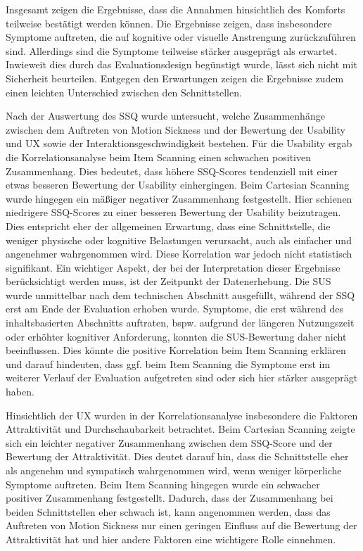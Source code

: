Insgesamt zeigen die Ergebnisse, dass die Annahmen hinsichtlich des Komforts teilweise bestätigt werden können. Die Ergebnisse zeigen, dass insbesondere Symptome auftreten, die auf kognitive oder visuelle Anstrengung zurückzuführen sind. Allerdings sind die Symptome teilweise stärker ausgeprägt als erwartet. Inwieweit dies durch das Evaluationsdesign begünstigt wurde, lässt sich nicht mit Sicherheit beurteilen. Entgegen den Erwartungen zeigen die Ergebnisse zudem einen leichten Unterschied zwischen den Schnittstellen. 

Nach der Auswertung des SSQ wurde untersucht, welche Zusammenhänge zwischen dem Auftreten von Motion Sickness und der Bewertung der Usability und UX sowie der Interaktionsgeschwindigkeit bestehen.
Für die Usability ergab die Korrelationsanalyse beim Item Scanning einen schwachen positiven Zusammenhang. Dies bedeutet, dass höhere SSQ-Scores tendenziell mit einer etwas besseren Bewertung der Usability einhergingen. Beim Cartesian Scanning wurde hingegen ein mäßiger negativer Zusammenhang festgestellt. Hier schienen niedrigere SSQ-Scores zu einer besseren Bewertung der Usability beizutragen. Dies entspricht eher der allgemeinen Erwartung, dass eine Schnittstelle, die weniger physische oder kognitive Belastungen verursacht, auch als einfacher und angenehmer wahrgenommen wird. Diese Korrelation war jedoch nicht statistisch signifikant. Ein wichtiger Aspekt, der bei der Interpretation dieser Ergebnisse berücksichtigt werden muss, ist der Zeitpunkt der Datenerhebung. Die SUS wurde unmittelbar nach dem technischen Abschnitt ausgefüllt, während der SSQ erst am Ende der Evaluation erhoben wurde. Symptome, die erst während des inhaltsbasierten Abschnitts auftraten, bspw. aufgrund der längeren Nutzungszeit oder erhöhter kognitiver Anforderung, konnten die SUS-Bewertung daher nicht beeinflussen. Dies könnte die positive Korrelation beim Item Scanning erklären und darauf hindeuten, dass ggf. beim Item Scanning die Symptome erst im weiterer Verlauf der Evaluation aufgetreten sind oder sich hier stärker ausgeprägt haben.

Hinsichtlich der UX wurden in der Korrelationsanalyse insbesondere die Faktoren Attraktivität und Durchschaubarkeit betrachtet. 
Beim Cartesian Scanning zeigte sich ein leichter negativer Zusammenhang zwischen dem SSQ-Score und der Bewertung der Attraktivität. Dies deutet darauf hin, dass die Schnittstelle eher als angenehm und sympatisch wahrgenommen wird, wenn weniger körperliche Symptome auftreten. Beim Item Scanning hingegen wurde ein schwacher positiver Zusammenhang festgestellt. Dadurch, dass der Zusammenhang bei beiden Schnittstellen eher schwach ist, kann angenommen werden, dass das Auftreten von Motion Sickness nur einen geringen Einfluss auf die Bewertung der Attraktivität hat und hier andere Faktoren eine wichtigere Rolle einnehmen. 

